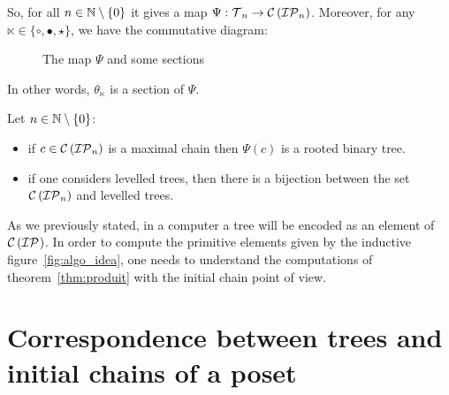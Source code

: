 So, for all $n\in\mathbb{N}\setminus\{0\}$ it gives a map $\Psi:\operatorname{\mathcal{T}}_n\rightarrow \mathcal{C}\left(\mathcal{IP}_{n}\right)$. Moreover, for any $\ltimes\in\{\circ,\bullet,\star\}$, we have the commutative diagram:
\begin{figure}
	\centering
	\caption{The map $\Psi$ and some sections}
	\label{fig:Psi}
\end{figure}
In other words, $\theta_{\ltimes}$ is a section of $\Psi.$

\begin{Rq}
	Let $n\in\mathbb{N}\setminus\{0\}$:
	\begin{itemize}
		\item if $c\in\mathcal{C}\left(\mathcal{IP}_{n}\right)$ is a maximal chain then $\Psi(c)$ is a rooted binary tree.
		\item if one considers levelled \Sch{} trees, then there is a bijection between the set $\mathcal{C}\left(\mathcal{IP}_{n}\right)$ and levelled \Sch{} trees. 
	\end{itemize}
\end{Rq}

As we previously stated, in a computer a tree will be encoded as an element of $\mathcal{C}\left(\mathcal{IP}_{}\right)$. In order to compute the primitive elements given by the inductive figure~\ref{fig:algo_idea}, one needs to understand the computations of theorem~\ref{thm:produit} with the initial chain point of view.

\section{Correspondence between trees and initial chains of a poset}

